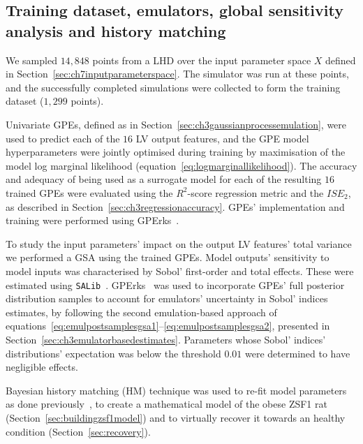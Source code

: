 %
%
%
\subsection{Training dataset, emulators, global sensitivity analysis and history matching}
We sampled $14,848$ points from a LHD over the input parameter space $X$ defined in Section~\ref{sec:ch7inputparameterspace}. The simulator was run at these points, and the successfully completed simulations were collected to form the training dataset ($1,299$ points).

\vspace{0.2cm}
Univariate GPEs, defined as in Section~\ref{sec:ch3gaussianprocessemulation}, were used to predict each of the $16$ LV output features, and the GPE model hyperparameters were jointly optimised during training by maximisation of the model log marginal likelihood (equation~\eqref{eq:logmarginallikelihood}). The accuracy and adequacy of being used as a surrogate model for each of the resulting $16$ trained GPEs were evaluated using the $R^2$-score regression metric and the $ISE_2$, as described in Section~\ref{sec:ch3regressionaccuracy}. GPEs' implementation and training were performed using GPErks~\cite{GPErks:2021}.

\vspace{0.2cm}
To study the input parameters' impact on the output LV features' total variance we performed a GSA using the trained GPEs. Model outputs' sensitivity to model inputs was characterised by Sobol' first-order and total effects. These were estimated using \texttt{SALib}~\cite{Herman:2017}. GPErks~\cite{GPErks:2021} was used to incorporate GPEs' full posterior distribution samples to account for emulators' uncertainty in Sobol' indices estimates, by following the second emulation-based approach of equations~\eqref{eq:emulpostsamplesgsa1}--\eqref{eq:emulpostsamplesgsa2}, presented in Section~\ref{sec:ch3emulatorbasedestimates}. Parameters whose Sobol' indices' distributions' expectation was below the threshold $0.01$ were determined to have negligible effects.

\vspace{0.2cm}
Bayesian history matching (HM) technique was used to re-fit model parameters as done previously~\cite{Longobardi:2020}, to create a mathematical model of the obese ZSF1 rat (Section~\ref{sec:buildingzsf1model}) and to virtually recover it towards an healthy condition (Section~\ref{sec:recovery}).




%
%
%
